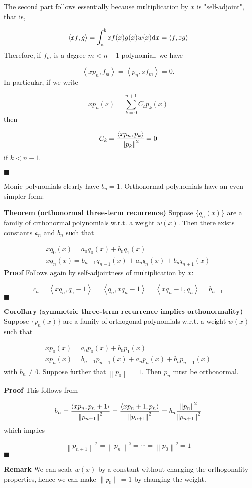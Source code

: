 \documentclass[12pt,a4paper]{article}
\def\D{ {\rm d} }
\def\ip<#1>{\left\langle{#1}\right\rangle}
\def\dx{\D x}
\def\norm#1{\left\| #1 \right\|}
\begin{document}
The second part follows essentially because multiplication by $x$ is "self-adjoint", that is,

\[
\ip<x f, g> = \int_a^b x f(x) g(x) w(x) \dx = \ip<f, x g>
\]
Therefore, if $f_m$ is a degree $m < n-1$ polynomial, we have

\[
\ip<x p_n, f_m> = \ip<p_n, x f_m> = 0.
\]
In particular, if we write

\[
x p_n(x) = \sum_{k=0}^{n+1} C_k p_k(x)
\]
then

\[
C_k = {\ip< x p_n, p_k> \over \norm{p_k}^2} = 0
\]
if $k < n-1$.

\ensuremath{\blacksquare}

Monic polynomials clearly have $b_n = 1$.  Orthonormal polynomials have an even simpler form:

\textbf{Theorem (orthonormal three-term recurrence)} Suppose $\{q_n(x)\}$ are a family of orthonormal polynomials w.r.t. a weight $w(x)$. Then there exists constants $a_n$ and $b_n$ such that


\begin{align*}
x q_0(x) = a_0 q_0(x)  + b_0 q_1(x)\\
x q_n(x) = b_{n-1} q_{n-1}(x) + a_n q_n(x) + b_{n} q_{n+1}(x)
\end{align*}
\textbf{Proof} Follows again by self-adjointness of multiplication by $x$:

\[
c_n = \ip<x q_n, q_{n-1}> = \ip<q_n, x q_{n-1}> = \ip<x q_{n-1}, q_n> = b_{n-1}
\]
\ensuremath{\blacksquare}

\textbf{Corollary (symmetric three-term recurrence implies orthonormality)} Suppose $\{p_n(x)\}$ are a family of orthogonal polynomials w.r.t. a weight $w(x)$ such that


\begin{align*}
x p_0(x) = a_0 p_0(x)  + b_0 p_1(x)\\
x p_n(x) = b_{n-1} p_{n-1}(x) + a_n p_n(x) + b_{n} p_{n+1}(x)
\end{align*}
with $b_n \neq 0$. Suppose further that $\norm{p_0} = 1$. Then $p_n$ must be orthonormal.

\textbf{Proof} This follows from

\[
b_n = {\ip<x p_n,p_{n+1}> \over \norm{p_{n+1}}^2} = {\ip<x p_{n+1}, p_n> \over \norm{p_{n+1}}^2} = b_n   {\norm{p_n}^2 \over \norm{p_{n+1}}^2 }
\]
which implies

\[
\norm{p_{n+1}}^2 = \norm{p_n}^2 = \cdots = \norm{p_0}^2 = 1
\]
\ensuremath{\blacksquare}

\textbf{Remark} We can scale $w(x)$ by a constant without changing the orthogonality properties, hence we can make $\|p_0\| = 1$ by changing the weight.
\end{document}
